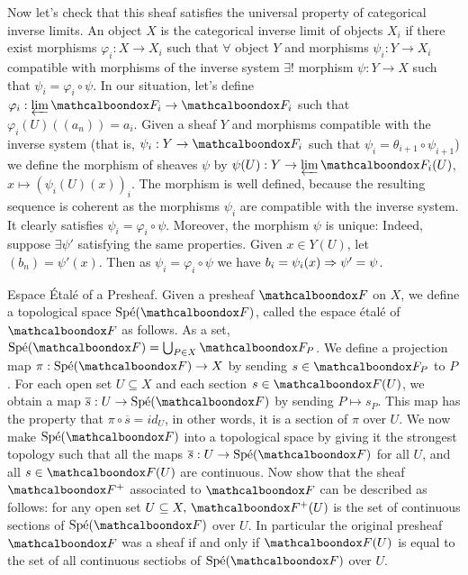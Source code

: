 \begin{sol}
	Now let's check that this sheaf satisfies the universal property of categorical inverse limits. An object $X$ is the categorical inverse limit of objects $X_i$ if there exist morphisms $\varphi_i: X \to X_i$ such that $\forall$ object $Y$ and morphisms $\psi_i: Y \to X_i$ compatible with morphisms of the inverse system $\exists !$ morphism $\psi: Y \to X$ such that $\psi_i = \varphi_i \circ \psi$. In our situation, let's define $\varphi_i: \varprojlim \sF_i \to \sF_i$ such that $\varphi_i(U)((a_n)) = a_i$. Given a sheaf $Y$ and morphisms compatible with the inverse system (that is, $\psi_i: Y \to \sF_i$ such that $\psi_i = \theta_{i+1} \circ \psi_{i+1}$) we define the morphism of sheaves $\psi$ by $\psi(U): Y \to \varprojlim \sF_i(U)$, $x \mapsto (\psi_i(U)(x))_i$. The morphism is well defined, because the resulting sequence is coherent as the morphisms $\psi_i$ are compatible with the inverse system. It clearly satisfies $\psi_i = \varphi_i \circ \psi$. Moreover, the morphism $\psi$ is unique: Indeed, suppose $\exists \psi'$ satisfying the same properties. Given $x \in Y(U)$, let $(b_n) = \psi'(x)$. Then as $\psi_i = \varphi_i \circ \psi$ we have $b_i = \psi_i(x) \Rightarrow \psi' = \psi$. 
\end{sol}

\begin{ex}
	Espace Étalé of a Presheaf. Given a presheaf $\sF$ on $X$, we define a topological space $\text{Spé}(\sF)$, called the espace étalé of $\sF$ as follows. As a set, $\spe(\sF) = \bigcup_{P \in X} \sF_P$. We define a projection map $\pi: \spe(\sF) \to X$ by sending $s \in \sF_P$ to $P$. For each open set $U \subseteq X$ and each section $s \in \sF(U)$, we obtain a map $\overline{s}: U \to \spe(\sF)$ by sending $P \mapsto s_P$. This map has the property that $\pi \circ \overline{s} = id_U$, in other words, it is a section of $\pi$ over $U$. We now make $\spe(\sF)$ into a topological space by giving it the strongest topology such that all the maps $\overline{s}: U \to \spe(\sF)$ for all $U$, and all $s \in \sF(U)$ are continuous. Now show that the sheaf $\sF^+$ associated to $\sF$ can be described as follows: for any open set $U \subseteq X, \, \sF^+(U)$ is the set of continuous sections of $\spe(\sF)$ over $U$. In particular the original presheaf $\sF$ was a sheaf if and only if $\sF(U)$ is equal to the set of all continuous sectiobs of $\spe(\sF)$ over $U$.
\end{ex}

